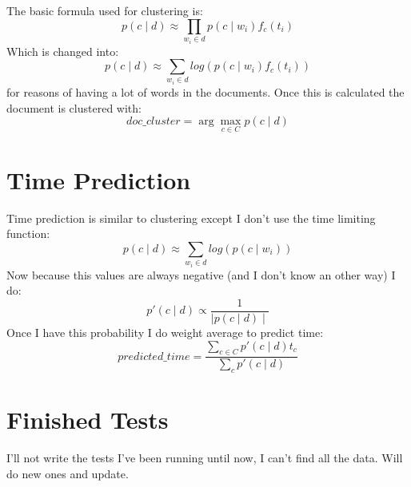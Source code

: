 \documentclass[11pt,a4paper]{article}
\begin{document}
The basic formula used for clustering is:
\begin{equation}
	p(c \mid d) \approx \prod_{w_i \in d}{p(c \mid w_i) f_c(t_i)}
\end{equation}
Which is changed into:
\begin{equation}
	p(c \mid d) \approx \sum_{w_i \in d}{log(p(c \mid w_i) f_c(t_i))}
\end{equation}
for reasons of having a lot of words in the documents. Once this is calculated the document is clustered with:
\begin{equation}
	doc\_cluster = \arg\max_{c \in C} p(c \mid d)
\end{equation}

\section{Time Prediction}
Time prediction is similar to clustering except I don't use the time limiting function:
\begin{equation}
	p(c \mid d) \approx \sum_{w_i \in d}{log(p(c \mid w_i))}
\end{equation}
Now because this values are always negative (and I don't know an other way) I do:
\begin{equation}
	p'(c \mid d) \propto \frac{1}{\mid p(c \mid d) \mid}
\end{equation}
Once I have this probability I do weight average to predict time:
\begin{equation}
	predicted\_time = \frac{\sum_{c \in C}{p'(c \mid d)t_c}}{\sum_c{p'(c \mid d)}}
\end{equation}

\section{Finished Tests}
I'll not write the tests I've been running until now, I can't find all the data. Will do new ones and update.
\end{document}
